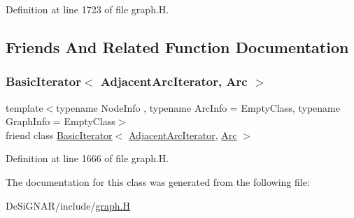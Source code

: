 Definition at line 1723 of file graph.\+H.



\subsection{Friends And Related Function Documentation}
\mbox{\label{class_designar_1_1_digraph_1_1_adjacent_arc_iterator_a73ad70d76f3331ee4b07451db1347918}} 
\subsubsection{\texorpdfstring{Basic\+Iterator$<$ Adjacent\+Arc\+Iterator, Arc $>$}{BasicIterator< AdjacentArcIterator, Arc >}}
{\footnotesize\ttfamily template$<$typename Node\+Info , typename Arc\+Info  = Empty\+Class, typename Graph\+Info  = Empty\+Class$>$ \\
friend class \hyperlink{class_designar_1_1_basic_iterator}{Basic\+Iterator}$<$ \hyperlink{class_designar_1_1_digraph_1_1_adjacent_arc_iterator}{Adjacent\+Arc\+Iterator}, \hyperlink{class_designar_1_1_digraph_a0ceb278671f2a535c00fddccdeafd69f}{Arc} $>$\hspace{0.3cm}{\ttfamily [friend]}}



Definition at line 1666 of file graph.\+H.



The documentation for this class was generated from the following file\+:\begin{DoxyCompactItemize}
\item 
De\+Si\+G\+N\+A\+R/include/\hyperlink{graph_8_h}{graph.\+H}\end{DoxyCompactItemize}
